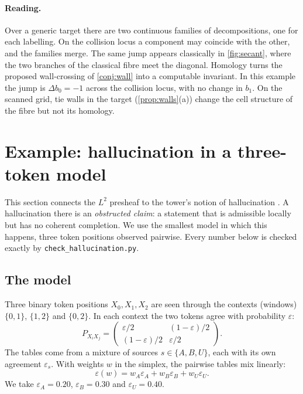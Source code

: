 \documentclass[11pt]{article}
\theoremstyle{definition}
\begin{document}
\paragraph{Reading.} Over a generic target there are two continuous families of decompositions, one for each labelling. On the
collision locus a component may coincide with the other, and the families merge. The same jump appears classically in
\cref{fig:secant}, where the two branches of the classical fibre meet the diagonal. Homology turns the proposed wall-crossing of
\cref{conj:wall} into a computable invariant. In this example the jump is $\Delta b_0=-1$ across the collision locus, with no change in
$b_1$. On the scanned grid, tie walls in the target (\cref{prop:walls}(a)) change the cell structure of the fibre but not its homology.

\FloatBarrier
\section{Example: hallucination in a three-token model}\label{sec:halluc}
This section connects the $L^2$ presheaf to the tower's notion of hallucination \cite[\S10.5]{Tower}. A hallucination there is an
\emph{obstructed claim}: a statement that is admissible locally but has no coherent completion. We use the smallest model in which this
happens, three token positions observed pairwise. Every number below is checked exactly by \texttt{check\_hallucination.py}.

\subsection{The model}
Three binary token positions $X_0,X_1,X_2$ are seen through the contexts (windows) $\{0,1\}$, $\{1,2\}$ and $\{0,2\}$. In each context
the two tokens agree with probability $\varepsilon$:
\[
P_{X_iX_j}=\begin{pmatrix}\varepsilon/2&(1-\varepsilon)/2\\(1-\varepsilon)/2&\varepsilon/2\end{pmatrix}.
\]
The tables come from a mixture of sources $s\in\{A,B,U\}$, each with its own agreement $\varepsilon_s$. With weights $w$ in the simplex,
the pairwise tables mix linearly:
\[
\varepsilon(w)=w_A\varepsilon_A+w_B\varepsilon_B+w_U\varepsilon_U .
\]
We take $\varepsilon_A=0.20$, $\varepsilon_B=0.30$ and $\varepsilon_U=0.40$.
\end{document}
